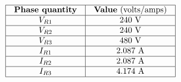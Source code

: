 $$\vbox{\offinterlineskip
\halign{\strut
\vrule \quad\hfil # \ \hfil & 
\vrule \quad\hfil # \ \hfil \vrule \cr
\noalign{\hrule}
%
{\bf Phase quantity} & {\bf Value} (volts/amps) \cr
%
\noalign{\hrule}
%
$V_{R1}$ & 240 V \cr
%
\noalign{\hrule}
%
$V_{R2}$ & 240 V \cr
%
\noalign{\hrule}
%
$V_{R3}$ & 480 V \cr
%
\noalign{\hrule}
%
$I_{R1}$ & 2.087 A \cr
%
\noalign{\hrule}
%
$I_{R2}$ & 2.087 A \cr
%
\noalign{\hrule}
%
$I_{R3}$ & 4.174 A \cr
%
\noalign{\hrule}
} %
}$$ %





